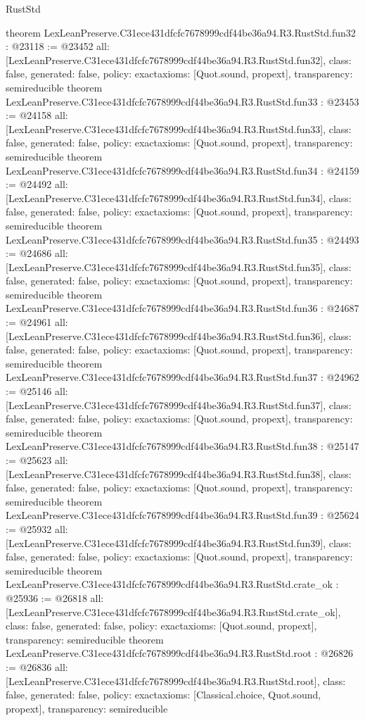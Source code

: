 \begin{lexlean}{RustStd}
\begin{coremodule}
{}
theorem LexLeanPreserve.C31ece431dfcfc7678999cdf44be36a94.R3.RustStd.fun32 : @23118 := @23452 {
  all: [LexLeanPreserve.C31ece431dfcfc7678999cdf44be36a94.R3.RustStd.fun32],
  class: false,
  generated: false,
  policy: exact{axioms: [Quot.sound, propext]},
  transparency: semireducible
}
theorem LexLeanPreserve.C31ece431dfcfc7678999cdf44be36a94.R3.RustStd.fun33 : @23453 := @24158 {
  all: [LexLeanPreserve.C31ece431dfcfc7678999cdf44be36a94.R3.RustStd.fun33],
  class: false,
  generated: false,
  policy: exact{axioms: [Quot.sound, propext]},
  transparency: semireducible
}
theorem LexLeanPreserve.C31ece431dfcfc7678999cdf44be36a94.R3.RustStd.fun34 : @24159 := @24492 {
  all: [LexLeanPreserve.C31ece431dfcfc7678999cdf44be36a94.R3.RustStd.fun34],
  class: false,
  generated: false,
  policy: exact{axioms: [Quot.sound, propext]},
  transparency: semireducible
}
theorem LexLeanPreserve.C31ece431dfcfc7678999cdf44be36a94.R3.RustStd.fun35 : @24493 := @24686 {
  all: [LexLeanPreserve.C31ece431dfcfc7678999cdf44be36a94.R3.RustStd.fun35],
  class: false,
  generated: false,
  policy: exact{axioms: [Quot.sound, propext]},
  transparency: semireducible
}
theorem LexLeanPreserve.C31ece431dfcfc7678999cdf44be36a94.R3.RustStd.fun36 : @24687 := @24961 {
  all: [LexLeanPreserve.C31ece431dfcfc7678999cdf44be36a94.R3.RustStd.fun36],
  class: false,
  generated: false,
  policy: exact{axioms: [Quot.sound, propext]},
  transparency: semireducible
}
theorem LexLeanPreserve.C31ece431dfcfc7678999cdf44be36a94.R3.RustStd.fun37 : @24962 := @25146 {
  all: [LexLeanPreserve.C31ece431dfcfc7678999cdf44be36a94.R3.RustStd.fun37],
  class: false,
  generated: false,
  policy: exact{axioms: [Quot.sound, propext]},
  transparency: semireducible
}
theorem LexLeanPreserve.C31ece431dfcfc7678999cdf44be36a94.R3.RustStd.fun38 : @25147 := @25623 {
  all: [LexLeanPreserve.C31ece431dfcfc7678999cdf44be36a94.R3.RustStd.fun38],
  class: false,
  generated: false,
  policy: exact{axioms: [Quot.sound, propext]},
  transparency: semireducible
}
theorem LexLeanPreserve.C31ece431dfcfc7678999cdf44be36a94.R3.RustStd.fun39 : @25624 := @25932 {
  all: [LexLeanPreserve.C31ece431dfcfc7678999cdf44be36a94.R3.RustStd.fun39],
  class: false,
  generated: false,
  policy: exact{axioms: [Quot.sound, propext]},
  transparency: semireducible
}
theorem LexLeanPreserve.C31ece431dfcfc7678999cdf44be36a94.R3.RustStd.crate_ok : @25936 := @26818 {
  all: [LexLeanPreserve.C31ece431dfcfc7678999cdf44be36a94.R3.RustStd.crate_ok],
  class: false,
  generated: false,
  policy: exact{axioms: [Quot.sound, propext]},
  transparency: semireducible
}
theorem LexLeanPreserve.C31ece431dfcfc7678999cdf44be36a94.R3.RustStd.root : @26826 := @26836 {
  all: [LexLeanPreserve.C31ece431dfcfc7678999cdf44be36a94.R3.RustStd.root],
  class: false,
  generated: false,
  policy: exact{axioms: [Classical.choice, Quot.sound, propext]},
  transparency: semireducible
}


\end{coremodule}
\end{lexlean}
